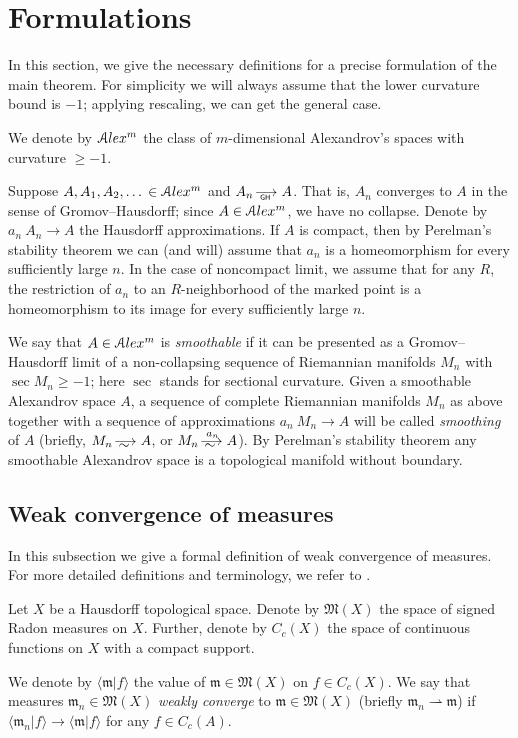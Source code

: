 \section{Formulations}

In this section, we give the necessary definitions for a precise formulation of the main theorem.
For simplicity  we will always assume that the lower
curvature bound is  $-1$;
applying rescaling, we can get the general case.

We denote by
$\mathcal{A}lex^m$ the class of $m$-dimensional Alexandrov's spaces
with curvature $\ge -1$.

Suppose $A,A_1,A_2,\dots{} \in \mathcal{A}lex^m$ and $A_n\GHto A$.
That is, $A_n$ converges to 
$A$ in the sense of Gromov--Hausdorff;
since $A\in \mathcal{A}lex^m$, we have no collapse.
Denote by $a_n\:A_n\to A$ the Hausdorff approximations.
If $A$ is compact, then
by Perelman's stability theorem \cite{PerStab,KapStab} we can (and will) assume that $a_n$ is a homeomorphism for every sufficiently large $n$.
In the case of noncompact limit, we assume that for any $R$, the restriction of $a_n$ to an $R$-neighborhood of the marked point is a homeomorphism to its image for every sufficiently large $n$.

We say that $A\in \mathcal{A}lex^m$ is \emph{smoothable}
if it can be presented as a Gromov--Hausdorff limit of a non-collapsing sequence of Riemannian manifolds $M_n$ with $\sec M_n\ge-1$; here $\sec$ stands for sectional curvature.
Given a smoothable Alexandrov space $A$,
a sequence of complete Riemannian manifolds $M_n$ as above together with a sequence of approximations $a_n\:M_n\to A$
will be called \emph{smoothing} of $A$
(briefly, $M_n\smooths{} A$, or $M_n\smooths{a_n} A$).
By Perelman's stability theorem any smoothable Alexandrov space is a topological manifold without boundary.

\subsection{Weak convergence of measures}

In this subsection we give a formal definition of weak convergence of measures.
For more detailed definitions and terminology, we refer to
\cite{GMS}.

Let $X$ be a Hausdorff topological space.
Denote by $\mathfrak M(X)$ the space of signed Radon measures on $X$.
Further, denote by $C_c(X)$  the space of continuous functions on $X$
with a compact support. 

We  denote by $\langle \mathfrak m|f\rangle $ the value of $\mathfrak m\in\mathfrak M(X)$ on $f\in C_c(X)$.
We say that measures $\mathfrak m_n\in \mathfrak M(X)$ \emph{weakly converge} to $\mathfrak m\in \mathfrak M(X)$ (briefly
$\mathfrak m_n\rightharpoonup \mathfrak m$) if $\langle \mathfrak m_n|f\rangle \to \langle \mathfrak m|f\rangle $ for any $f\in C_c(A)$.

